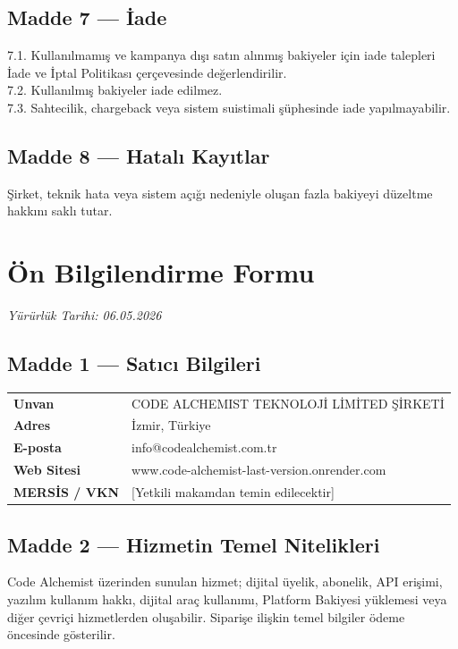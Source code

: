 \documentclass[12pt,a4paper]{article}
\begin{document}
\subsection*{Madde 7 --- \.{I}ade}
7.1. Kullan{\i}lmam{\i}\c{s} ve kampanya d{\i}\c{s}{\i} sat{\i}n al{\i}nm{\i}\c{s} bakiyeler i\c{c}in iade talepleri
\.{I}ade ve \.{I}ptal Politikas{\i} \c{c}er\c{c}evesinde de\u{g}erlendirilir.\\
7.2. Kullan{\i}lm{\i}\c{s} bakiyeler iade edilmez.\\
7.3. Sahtecilik, chargeback veya sistem suistimali \c{s}\"{u}phesinde iade yap{\i}lmayabilir.

\subsection*{Madde 8 --- Hatal{\i} Kay{\i}tlar}
\c{S}irket, teknik hata veya sistem a\c{c}{\i}\u{g}{\i} nedeniyle olu\c{s}an fazla bakiyeyi d\"{u}zeltme hakk{\i}n{\i} sakl{\i} tutar.

\section{\"{O}n Bilgilendirme Formu}
\textit{Y\"{u}r\"{u}rl\"{u}k Tarihi: 06.05.2026}

\subsection*{Madde 1 --- Sat{\i}c{\i} Bilgileri}
\begin{center}
\begin{tabular}{|l|l|}
\hline
\textbf{Unvan}        & CODE ALCHEMIST TEKNOLOJ\.{I} L\.{I}M\.{I}TED \c{S}\.{I}RKET\.{I} \\
\textbf{Adres}        & \.{I}zmir, T\"{u}rkiye \\
\textbf{E-posta}      & info@codealchemist.com.tr \\
\textbf{Web Sitesi}   & www.code-alchemist-last-version.onrender.com \\
\textbf{MERS\.{I}S / VKN} & [Yetkili makamdan temin edilecektir] \\
\hline
\end{tabular}
\end{center}

\subsection*{Madde 2 --- Hizmetin Temel Nitelikleri}
Code Alchemist \"{u}zerinden sunulan hizmet; dijital \"{u}yelik, abonelik, API eri\c{s}imi, yaz{\i}l{\i}m
kullan{\i}m hakk{\i}, dijital ara\c{c} kullan{\i}m{\i}, Platform Bakiyesi y\"{u}klemesi veya di\u{g}er \c{c}evri\c{c}i
hizmetlerden olu\c{s}abilir. Siparişe ili\c{s}kin temel bilgiler \"{o}deme \"{o}ncesinde g\"{o}sterilir.
\end{document}
